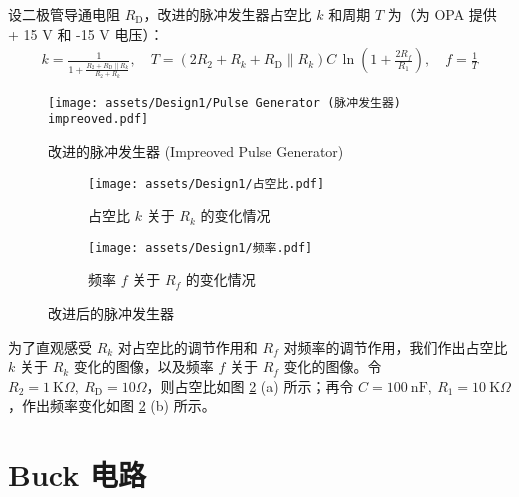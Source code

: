 \documentclass[UTF8]{article}
\def\kO{\ \mathrm{K}\Omega}
\def\KO{\ \mathrm{K}\Omega}
\def\nF{\ \mathrm{nF}}
\def\kO{\ \mathrm{K}\Omega}
\def\KO{\ \mathrm{K}\Omega}
\theoremstyle{MyLineTheoremStyle} %
\theoremstyle{MyBlockTheoremStyle} %
\theoremstyle{MySubsubsectionStyle} %
\begin{document}
设二极管导通电阻 $R_\text{D}$，改进的脉冲发生器占空比 $k$ 和周期 $T$ 为（为 OPA 提供 + 15 V 和 -15 V 电压）：
\begin{gather}
k = \frac{1}{1 + \frac{R_2 +  R_\text{D} \parallel R_k}{R_2 + R_k}},\quad 
T = \left( 2R_2 + R_k + R_\text{D} \parallel R_k \right)C \, \ln \left(1 + \frac{2 R_f}{R_1}\right),\quad f = \frac{1}{T}
\end{gather}
\begin{figure}[H]\centering
    \texttt{[image: assets/Design1/Pulse Generator (脉冲发生器) impreoved.pdf]}
    \caption{改进的脉冲发生器 (Impreoved Pulse Generator)}
    \label{fig:Impreoved Pulse Generator}
\end{figure}

\begin{figure}[H]\centering
\begin{subfigure}[b]{0.5\columnwidth}\centering
    \texttt{[image: assets/Design1/占空比.pdf]}
    \caption{占空比 $k$ 关于 $R_k$ 的变化情况}
\end{subfigure}\hfill
\begin{subfigure}[b]{0.5\columnwidth}\centering
    \texttt{[image: assets/Design1/频率.pdf]}
    \caption{频率 $f$ 关于 $R_f$ 的变化情况}
\end{subfigure}
\caption{改进后的脉冲发生器}
\label{fig:Impreoved Pulse Generator}
\end{figure}

为了直观感受 $R_k$ 对占空比的调节作用和 $R_f$ 对频率的调节作用，我们作出占空比 $k$ 关于 $R_k$ 变化的图像，以及频率 $f$ 关于 $R_f$ 变化的图像。令 $R_2 = 1\kO,\ R_\text{D} = 10 \Omega$，则占空比如图 \ref{fig:Impreoved Pulse Generator} (a) 所示；再令 $C = 100 \nF,\ R_1 = 10 \KO$，作出频率变化如图 \ref{fig:Impreoved Pulse Generator} (b) 所示。

\section{Buck 电路}
\end{document}

